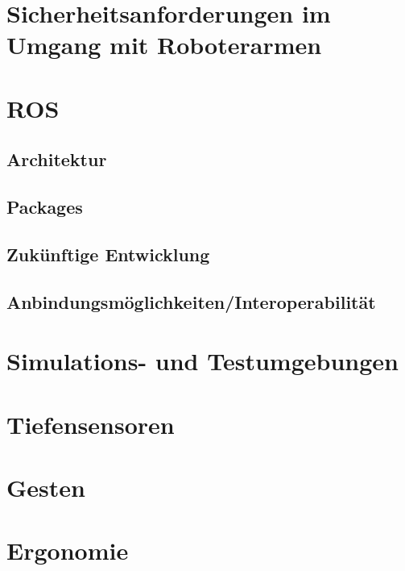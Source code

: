 \section{Sicherheitsanforderungen im Umgang mit Roboterarmen}


\section{ROS}


\subsection{Architektur}


\subsection{Packages}


\subsection{Zukünftige Entwicklung}


\subsection{Anbindungsmöglichkeiten/Interoperabilität}


\section{Simulations- und Testumgebungen}


\section{Tiefensensoren}


\section{Gesten}


\section{Ergonomie}
